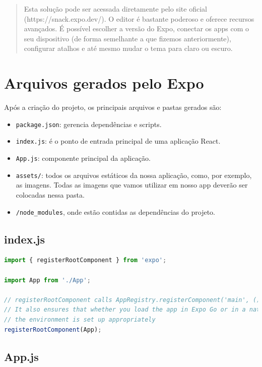 \begin{quote}
Esta solução pode ser acessada diretamente pelo site oficial (https://snack.expo.dev/). O editor é bastante poderoso e oferece recursos avançados. É possível escolher a versão do Expo, conectar os apps com o seu dispositivo (de forma semelhante a que fizemos anteriormente), configurar atalhos e até mesmo mudar o tema para claro ou escuro.
\end{quote}

\section{Arquivos gerados pelo Expo}

Após a criação do projeto, os principais arquivos e pastas gerados são:

\begin{itemize}
  \item \texttt{package.json}: gerencia dependências e scripts.
  \item \texttt{index.js}: é o ponto de entrada principal de uma aplicação React.
  \item \texttt{App.js}: componente principal da aplicação.
  \item \texttt{assets/}: todos os arquivos estáticos da nossa aplicação, como, por exemplo, as imagens. Todas as imagens que vamos utilizar em nosso app deverão ser colocadas nessa pasta. 
  \item \texttt{/node\_modules}, onde estão contidas as dependências do projeto.
\end{itemize}


\subsection*{index.js}
\begin{lstlisting}[language=JavaScript, caption={Conteúdo de index.js}]
import { registerRootComponent } from 'expo';

import App from './App';

// registerRootComponent calls AppRegistry.registerComponent('main', () => App);
// It also ensures that whether you load the app in Expo Go or in a native build,
// the environment is set up appropriately
registerRootComponent(App);

\end{lstlisting}

\subsection*{App.js}


